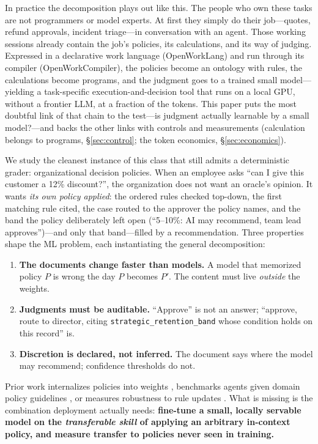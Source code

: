 \documentclass[11pt]{article}
\begin{document}
In practice the decomposition plays out like this. The people who own these tasks are not programmers or model experts. At first they simply do their job---quotes, refund approvals, incident triage---in conversation with an agent. Those working sessions already contain the job's policies, its calculations, and its way of judging. Expressed in a declarative work language (OpenWorkLang) and run through its compiler (OpenWorkCompiler), the policies become an ontology with rules, the calculations become programs, and the judgment goes to a trained small model---yielding a task-specific execution-and-decision tool that runs on a local GPU, without a frontier LLM, at a fraction of the tokens. This paper puts the most doubtful link of that chain to the test---is judgment actually learnable by a small model?---and backs the other links with controls and measurements (calculation belongs to programs, \S\ref{sec:control}; the token economics, \S\ref{sec:economics}).

We study the cleanest instance of this class that still admits a deterministic grader: organizational decision policies. When an employee asks ``can I give this customer a 12\% discount?'', the organization does not want an oracle's opinion. It wants \emph{its own policy applied}: the ordered rules checked top-down, the first matching rule cited, the case routed to the approver the policy names, and the band the policy deliberately left open (``5--10\%: AI may recommend, team lead approves'')---and only that band---filled by a recommendation. Three properties shape the ML problem, each instantiating the general decomposition:

\begin{enumerate}
  \item \textbf{The documents change faster than models.} A model that memorized policy $P$ is wrong the day $P$ becomes $P'$. The content must live \emph{outside} the weights.
  \item \textbf{Judgments must be auditable.} ``Approve'' is not an answer; ``approve, route to director, citing \texttt{strategic\_retention\_band} whose condition holds on this record'' is.
  \item \textbf{Discretion is declared, not inferred.} The document says where the model may recommend; confidence thresholds do not.
\end{enumerate}

Prior work internalizes policies into weights \citep{trimpi2025}, benchmarks agents given domain policy guidelines \citep{taubench2024,rulearena2024}, or measures robustness to rule updates \citep{guidebench2025}. What is missing is the combination deployment actually needs: \textbf{fine-tune a small, locally servable model on the \emph{transferable skill} of applying an arbitrary in-context policy, and measure transfer to policies never seen in training.}
\end{document}
